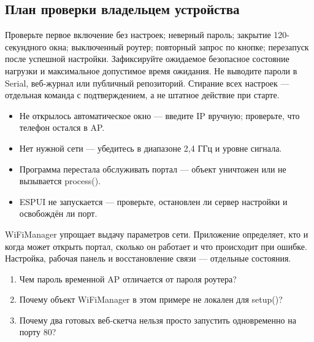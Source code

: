 \subsection{План проверки владельцем устройства}

Проверьте первое включение без настроек; неверный пароль; закрытие 120-секундного окна;
выключенный роутер; повторный запрос по кнопке; перезапуск после успешной настройки.
Зафиксируйте ожидаемое безопасное состояние нагрузки и максимальное допустимое время ожидания.
Не выводите пароли в Serial, веб-журнал или публичный репозиторий.
Стирание всех настроек --- отдельная команда с подтверждением, а не штатное действие при старте.

\begin{trouble}
\begin{itemize}[leftmargin=*]
  \item Не открылось автоматическое окно --- введите IP вручную; проверьте, что телефон остался в AP.
  \item Нет нужной сети --- убедитесь в диапазоне 2,4 ГГц и уровне сигнала.
  \item Программа перестала обслуживать портал --- объект уничтожен или не вызывается process().
  \item ESPUI не запускается --- проверьте, остановлен ли сервер настройки и освобождён ли порт.
\end{itemize}
\end{trouble}

\begin{summary}
WiFiManager упрощает выдачу параметров сети. Приложение определяет, кто и когда может
открыть портал, сколько он работает и что происходит при ошибке.
Настройка, рабочая панель и восстановление связи --- отдельные состояния.
\end{summary}

\begin{selfcheck}
\begin{enumerate}
  \item Чем пароль временной AP отличается от пароля роутера?
  \item Почему объект WiFiManager в этом примере не локален для setup()?
  \item Почему два готовых веб-скетча нельзя просто запустить одновременно на порту 80?
\end{enumerate}
\end{selfcheck}

